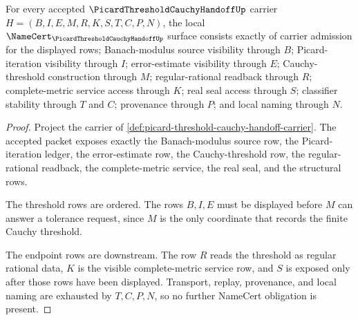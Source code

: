 \begin{theorem}
\label{thm:picard-threshold-cauchy-handoff-namecert-obligations}
For every accepted $\PicardThresholdCauchyHandoffUp$ carrier $H=(B,I,E,M,R,K,S,T,C,P,N)$, the local $\NameCert_{\PicardThresholdCauchyHandoffUp}$ surface consists exactly of carrier admission for the displayed rows; Banach-modulus source visibility through $B$; Picard-iteration visibility through $I$; error-estimate visibility through $E$; Cauchy-threshold construction through $M$; regular-rational readback through $R$; complete-metric service access through $K$; real seal access through $S$; classifier stability through $T$ and $C$; provenance through $P$; and local naming through $N$.
\end{theorem}
\begin{proof}
Project the carrier of \autoref{def:picard-threshold-cauchy-handoff-carrier}. The accepted packet exposes exactly the Banach-modulus source row, the Picard-iteration ledger, the error-estimate row, the Cauchy-threshold row, the regular-rational readback, the complete-metric service, the real seal, and the structural rows.

The threshold rows are ordered. The rows $B,I,E$ must be displayed before $M$ can answer a tolerance request, since $M$ is the only coordinate that records the finite Cauchy threshold.

The endpoint rows are downstream. The row $R$ reads the threshold as regular rational data, $K$ is the visible complete-metric service row, and $S$ is exposed only after those rows have been displayed. Transport, replay, provenance, and local naming are exhausted by $T,C,P,N$, so no further NameCert obligation is present.
\end{proof}

